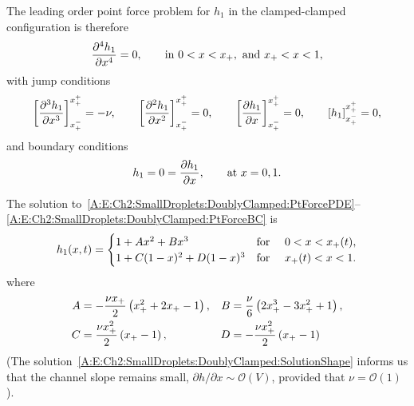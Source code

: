 \begin{subappendices}
The leading order point force problem for $h_1$ in the clamped-clamped configuration is therefore
\begin{equation}\label{A:E:Ch2:SmallDroplets:DoublyClamped:PtForcePDE}
\frac{\partial ^4 h_1}{\partial x^4} = 0, \qquad \text{in}~0< x < x_{+},~\text{and}~x_{+} < x < 1,
\end{equation}
with jump conditions
\begin{equation}\label{A:E:Ch2:SmallDroplets:DoublyClamped:PtForceJump}
\left[\frac{\partial ^3 h_1}{\partial x^3}\right]_{x_{+}^-}^{x_{+}^+} = -\nu, \qquad \left[\frac{\partial ^2 h_1}{\partial x^2}\right]_{x_{+}^-}^{x_{+}^+} =0, \qquad \left[\frac{\partial  h_1}{\partial x}\right]_{x_{+}^-}^{x_{+}^+} =0,\qquad \left[h_1\right]_{x_{+}^-}^{x_{+}^+} = 0,
\end{equation}
and boundary conditions
\begin{equation}\label{A:E:Ch2:SmallDroplets:DoublyClamped:PtForceBC}
h_1 = 0 = \frac{\partial h_1}{\partial x}, \qquad\text{at}~x = 0, 1.
\end{equation}

The solution to~\eqref{A:E:Ch2:SmallDroplets:DoublyClamped:PtForcePDE}--\eqref{A:E:Ch2:SmallDroplets:DoublyClamped:PtForceBC} is
\begin{equation}\label{A:E:Ch2:SmallDroplets:DoublyClamped:SolutionShape}
h_1(x,t) = \begin{cases}{}
       1 + Ax^2 + Bx^3& \text{for }\quad 0 < x < x_{+}(t), \\
  1 + C(1-x)^2 + D(1-x)^3& \text{for }\quad x_{+}(t) < x < 1.
        \end{cases}
\end{equation}
where
\begin{align}
A &= -\frac{\nu x_{+}}{2} \left(x_{+}^2 + 2x_{+} -1\right),&  B &= \frac{\nu}{6}\left(2x_{+}^3 - 3x_{+}^2 + 1\right),\label{A:E:Ch2:SmallDroplets:DoublyClamped:SolutionShapeCoeffs1}\\
C &= \frac{\nu x_{+}^2}{2}\left(x_{+} -1\right), & D&= -\frac{\nu x_{+}^2}{2}\left(x_{+} -1\right)\label{A:E:Ch2:SmallDroplets:DoublyClamped:SolutionShapeCoeffs2}
\end{align}
(The solution~\eqref{A:E:Ch2:SmallDroplets:DoublyClamped:SolutionShape} informs us that the channel slope remains small, $\partial h/\partial x \sim \mathcal{O}(V)$, provided that $\nu =  \mathcal{O}(1)$).


\end{subappendices}
